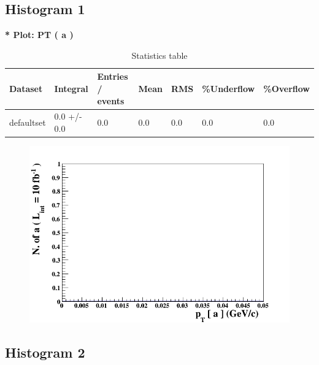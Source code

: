 \documentclass[a4paper, 11pt]{article}
\begin{document}
\subsection{ Histogram 1}

   \textbf{   * Plot: PT ( a ) }
\textbf{ }\begin{table}[!h]
  \begin{center}
    \caption{ Statistics table}
    \begin{tabular}{|m{17.0mm}|m{27.0mm}|m{23.0mm}|m{18.0mm}|m{18.0mm}|m{14.0mm}|m{14.0mm}|}
      \hline
      \cellcolor{yellow}         Dataset& \cellcolor{yellow}         Integral& \cellcolor{yellow}         Entries /\- events& \cellcolor{yellow}         Mean& \cellcolor{yellow}         RMS& \cellcolor{yellow}         \%Underflow& \cellcolor{yellow}         \%Overflow\\
      \hline
      \cellcolor{white}         defaultset& \cellcolor{white}         0.0 +/\-- 0.0& \cellcolor{white}         0.0& \cellcolor{white}         0.0& \cellcolor{white}         0.0& \cellcolor{green}         0.0& \cellcolor{green}         0.0\\
\hline
    \end{tabular}
  \end{center}
\end{table}

\begin{figure}[!h]
  \begin{center}
    \includegraphics[scale=0.6]{selection_0.png}\\
\caption{}
  \end{center}
\end{figure}
\newpage
   \newpage
\subsection{ Histogram 2}
\end{document}
